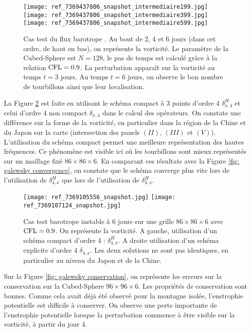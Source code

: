 \begin{figure}[htbp]
\begin{center}
\texttt{[image: ref\_7369437806\_snapshot\_intermediaire199.jpg]}
\texttt{[image: ref\_7369437806\_snapshot\_intermediaire399.jpg]}
\texttt{[image: ref\_7369437806\_snapshot\_intermediaire599.jpg]}
\end{center}
\caption{Cas test du flux barotrope \cite{Galewsky2004}. Au bout de 2, 4 et 6 jours (dans cet ordre, de haut en bas), on représente la vorticité. Le paramètre de la Cubed-Sphere est $N=128$, le pas de temps est calculé grâce à la relation $\text{CFL}=0.9$. La perturbation apparaît sur la vorticité au temps $t=3$ jours. Au temps $t=6$ jours, on observe le bon nombre de tourbillons ainsi que leur localisation.}
\label{fig: galewsky 246}
\end{figure}

La Figure \ref{fig: galewsky compact/explicite} est faite en utilisant le schéma compact à 3 points d'ordre 4 $\delta_{x,4}^H$ et celui d'ordre 4 non compact $\delta_{x,4}$ dans le calcul des opérateurs. On constate une différence sur la forme de la vorticité, en particulier dans la région de la Chine et du Japon sur la carte (intersection des panels $(II)$, $(III)$ et $(V)$). L'utilisation du schéma compact permet une meilleure représentation des hautes fréquences. Ce phénomène est visible ici où les tourbillons sont mieux représentés sur un maillage fixé $86 \times 86 \times 6$. En comparant ces résultats avec la Figure \ref{fig: galewsky convergence}, on constate que le schéma converge plus vite lors de l'utilisation de $\delta_{4,x}^H$ que lors de l'utilisation de $\delta_{4,x}^H$.

\begin{figure}[htbp]
\begin{center}
\texttt{[image: ref\_7369105556\_snapshot.jpg]}
\texttt{[image: ref\_7369107124\_snapshot.jpg]}
\end{center}
\caption{Cas test barotrope instable \cite{Galewsky2004} à 6 jours sur une grille $86 \times 86 \times 6$ avec $\text{CFL}=0.9$. On représente la vorticité. A gauche, utilisation d'un schéma compact d'ordre 4 : $\delta_{4,x}^H$. A droite utilisation d'un schéma explicite d'ordre 4 $\delta_{4,x}$. Les deux solutions ne sont pas identiques, en particulier au niveau du Japon et de la Chine.}
\label{fig: galewsky compact/explicite}
\end{figure}

Sur la Figure \ref{fig: galewsky conservation}, on représente les erreurs sur la conservation sur la Cubed-Sphere $96 \times 96 \times 6$. Les propriétés de conservation sont bonnes.  Comme cela avait déjà été observé pour la montagne isolée, l'enstrophie potentielle est difficile à conserver. On observe une perte importante de l'enstrophie potentielle lorsque la perturbation commence à être visible sur la vorticité, à partir du jour 4.

